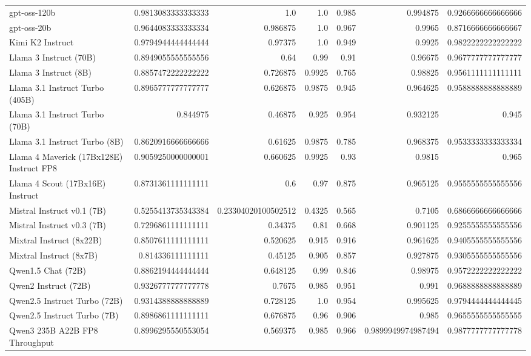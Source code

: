 \begin{table}[htp]
{\begin{tabular}{lrrrrrr}
gpt-oss-120b & 0.9813083333333333 & 1.0 & 1.0 & 0.985 & 0.994875 & 0.9266666666666666 \\
gpt-oss-20b & 0.9644083333333334 & 0.986875 & 1.0 & 0.967 & 0.9965 & 0.8716666666666667 \\
Kimi K2 Instruct & 0.9794944444444444 & 0.97375 & 1.0 & 0.949 & 0.9925 & 0.9822222222222222 \\
Llama 3 Instruct (70B) & 0.8949055555555556 & 0.64 & 0.99 & 0.91 & 0.96675 & 0.9677777777777777 \\
Llama 3 Instruct (8B) & 0.8857472222222222 & 0.726875 & 0.9925 & 0.765 & 0.98825 & 0.9561111111111111 \\
Llama 3.1 Instruct Turbo (405B) & 0.8965777777777777 & 0.626875 & 0.9875 & 0.945 & 0.964625 & 0.9588888888888889 \\
Llama 3.1 Instruct Turbo (70B) & 0.844975 & 0.46875 & 0.925 & 0.954 & 0.932125 & 0.945 \\
Llama 3.1 Instruct Turbo (8B) & 0.8620916666666666 & 0.61625 & 0.9875 & 0.785 & 0.968375 & 0.9533333333333334 \\
Llama 4 Maverick (17Bx128E) Instruct FP8 & 0.9059250000000001 & 0.660625 & 0.9925 & 0.93 & 0.9815 & 0.965 \\
Llama 4 Scout (17Bx16E) Instruct & 0.8731361111111111 & 0.6 & 0.97 & 0.875 & 0.965125 & 0.9555555555555556 \\
Mistral Instruct v0.1 (7B) & 0.5255413735343384 & 0.23304020100502512 & 0.4325 & 0.565 & 0.7105 & 0.6866666666666666 \\
Mistral Instruct v0.3 (7B) & 0.7296861111111111 & 0.34375 & 0.81 & 0.668 & 0.901125 & 0.9255555555555556 \\
Mixtral Instruct (8x22B) & 0.8507611111111111 & 0.520625 & 0.915 & 0.916 & 0.961625 & 0.9405555555555556 \\
Mixtral Instruct (8x7B) & 0.814336111111111 & 0.45125 & 0.905 & 0.857 & 0.927875 & 0.9305555555555556 \\
Qwen1.5 Chat (72B) & 0.8862194444444444 & 0.648125 & 0.99 & 0.846 & 0.98975 & 0.9572222222222222 \\
Qwen2 Instruct (72B) & 0.9326777777777778 & 0.7675 & 0.985 & 0.951 & 0.991 & 0.9688888888888889 \\
Qwen2.5 Instruct Turbo (72B) & 0.9314388888888889 & 0.728125 & 1.0 & 0.954 & 0.995625 & 0.9794444444444445 \\
Qwen2.5 Instruct Turbo (7B) & 0.8986861111111111 & 0.676875 & 0.96 & 0.906 & 0.985 & 0.9655555555555555 \\
Qwen3 235B A22B FP8 Throughput & 0.8996295550553054 & 0.569375 & 0.985 & 0.966 & 0.9899949974987494 & 0.9877777777777778 \\

\end{tabular}}
\end{table}
